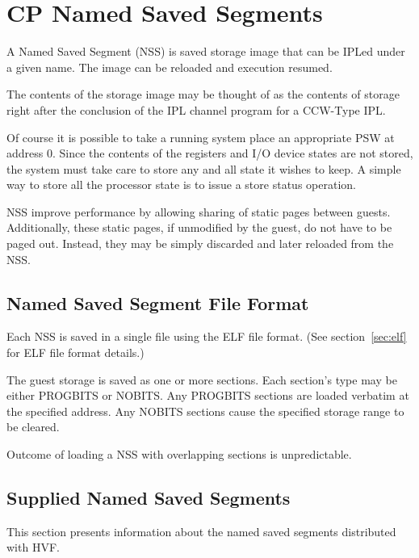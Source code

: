 \chapter{CP Named Saved Segments}
\label{chap:nss}
\cbstart
{}

A Named Saved Segment (NSS) is saved storage image that can be IPLed under a
given name.  The image can be reloaded and execution resumed.

The contents of the storage image may be thought of as the contents of
storage right after the conclusion of the IPL channel program for a CCW-Type
IPL.

Of course it is possible to take a running system place an appropriate PSW
at address 0.  Since the contents of the registers and I/O device states are
not stored, the system must take care to store any and all state it wishes
to keep.  A simple way to store all the processor state is to issue a store
status operation.

NSS improve performance by allowing sharing of static pages between guests.
Additionally, these static pages, if unmodified by the guest, do not have to
be paged out.  Instead, they may be simply discarded and later reloaded from
the NSS.

\section{Named Saved Segment File Format}
Each NSS is saved in a single file using the ELF file format.  (See
section~\ref{sec:elf} for ELF file format details.)

The guest storage is saved as one or more sections. Each section's type may
be either PROGBITS or NOBITS.  Any PROGBITS sections are loaded verbatim at
the specified address.  Any NOBITS sections cause the specified storage
range to be cleared.

Outcome of loading a NSS with overlapping sections is unpredictable.

\section{Supplied Named Saved Segments}
This section presents information about the named saved segments
distributed with HVF.


\cbend
